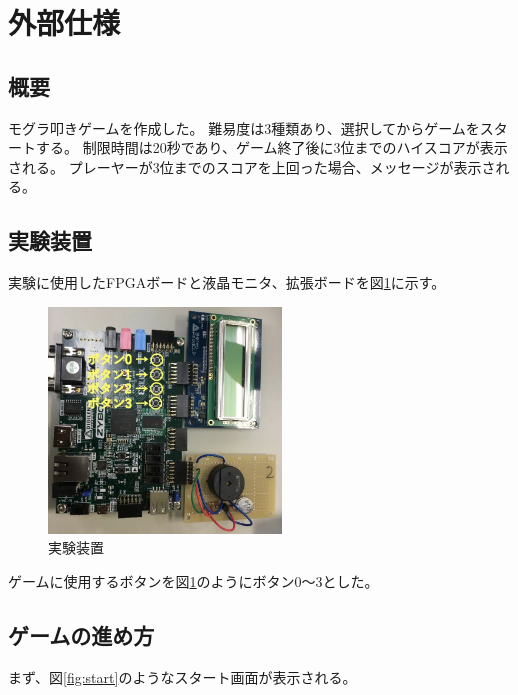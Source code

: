 \documentclass[11pt,a4j]{jsarticle}
\makeatletter
\newcommand{\figcaption}[1]{\def\@captype{figure}\caption{#1}}
\makeatother
\begin{document}



\section{外部仕様}
\label{sec:外部仕様}

\subsection{概要}
\label{sub:概要}

モグラ叩きゲームを作成した。
難易度は3種類あり、選択してからゲームをスタートする。
制限時間は20秒であり、ゲーム終了後に3位までのハイスコアが表示される。
プレーヤーが3位までのスコアを上回った場合、メッセージが表示される。

\subsection{実験装置}
\label{sub:実験装置}
実験に使用したFPGAボードと液晶モニタ、拡張ボードを図\ref{fig:machine}に示す。

\begin{figure}[H]
  \centering
  \includegraphics[height=60mm,bb=0 0 795 769]{img/machine.png}
  \figcaption{実験装置}
  \label{fig:machine}
\end{figure}

ゲームに使用するボタンを図\ref{fig:machine}のようにボタン0～3とした。

\subsection{ゲームの進め方}
\label{sub:ゲームの進め方}

まず、図\ref{fig:start}のようなスタート画面が表示される。
\end{document}
